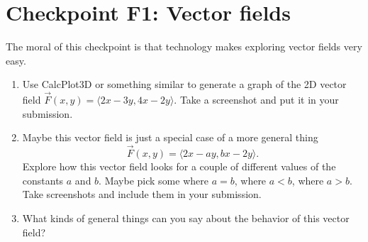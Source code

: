 


%


\allowdisplaybreaks
\section{Checkpoint F1: Vector fields}

The moral of this checkpoint is that technology makes exploring vector fields very easy.

\begin{enumerate}
    \item Use CalcPlot3D or something similar to generate a graph of the 2D vector field \(\vec{F}(x,y) = \langle 2x - 3y, 4x - 2y\rangle\). Take a screenshot and put it in your submission.
    \item Maybe this vector field is just a special case of a more general thing \[\vec{F}(x,y) = \langle 2x - ay, bx - 2y\rangle.\] Explore how this vector field looks for a couple of different values of the constants $a$ and $b$. Maybe pick some where $a = b$, where $a < b$, where $a > b$. Take screenshots and include them in your submission.
    \item What kinds of general things can you say about the behavior of this vector field?
\end{enumerate}


	
